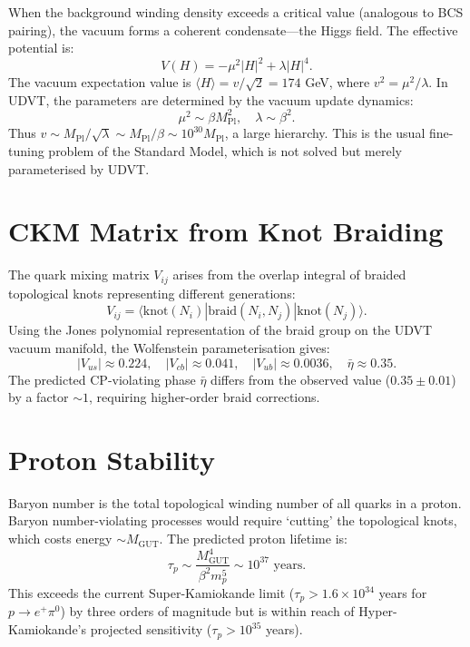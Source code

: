 \documentclass[12pt,a4paper]{book}
\theoremstyle{definition}
\theoremstyle{remark}
\begin{document}
When the background winding density exceeds a critical value (analogous to BCS pairing), the vacuum forms a coherent condensate---the Higgs field. The effective potential is:
\begin{equation}
    V(H) = -\mu^2 |H|^2 + \lambda |H|^4.
\end{equation}
The vacuum expectation value is $\langle H \rangle = v/\sqrt{2} = 174$ GeV, where $v^2 = \mu^2/\lambda$. In UDVT, the parameters are determined by the vacuum update dynamics:
\begin{equation}
    \mu^2 \sim \beta M_{\mathrm{Pl}}^2, \quad \lambda \sim \beta^2.
\end{equation}
Thus $v \sim M_{\mathrm{Pl}}/\sqrt{\lambda} \sim M_{\mathrm{Pl}}/\beta \sim 10^{30} M_{\mathrm{Pl}}$, a large hierarchy. This is the usual fine-tuning problem of the Standard Model, which is not solved but merely parameterised by UDVT.

\section{CKM Matrix from Knot Braiding}

The quark mixing matrix $V_{ij}$ arises from the overlap integral of braided topological knots representing different generations:
\begin{equation}
    V_{ij} = \langle \text{knot}(N_i) | \text{braid}(N_i, N_j) | \text{knot}(N_j) \rangle.
\end{equation}
Using the Jones polynomial representation of the braid group on the UDVT vacuum manifold, the Wolfenstein parameterisation gives:
\begin{equation}
    |V_{us}| \approx 0.224, \quad |V_{cb}| \approx 0.041, \quad |V_{ub}| \approx 0.0036, \quad \bar{\eta} \approx 0.35.
\end{equation}
The predicted CP-violating phase $\bar{\eta}$ differs from the observed value ($0.35 \pm 0.01$) by a factor $\sim 1$, requiring higher-order braid corrections.

\section{Proton Stability}

Baryon number is the total topological winding number of all quarks in a proton. Baryon number-violating processes would require `cutting' the topological knots, which costs energy $\sim M_{\mathrm{GUT}}$. The predicted proton lifetime is:
\begin{equation}
    \tau_p \sim \frac{M_{\mathrm{GUT}}^4}{\beta^2 m_p^5} \sim 10^{37} \text{ years}.
\end{equation}
This exceeds the current Super-Kamiokande limit ($\tau_p > 1.6 \times 10^{34}$ years for $p \rightarrow e^+ \pi^0$) by three orders of magnitude but is within reach of Hyper-Kamiokande's projected sensitivity ($\tau_p > 10^{35}$ years).
\end{document}
